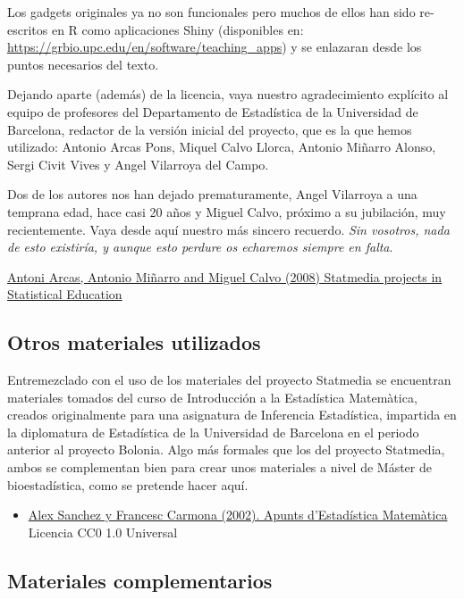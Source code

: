 \documentclass[
]{article}
\providecommand{\tightlist}{%
  \setlength{\itemsep}{0pt}\setlength{\parskip}{0pt}}
\begin{document}
Los gadgets originales ya no son funcionales pero muchos de ellos han sido re-escritos en R como aplicaciones Shiny (disponibles en: \url{https://grbio.upc.edu/en/software/teaching_apps}) y se enlazaran desde los puntos necesarios del texto.

Dejando aparte (además) de la licencia, vaya nuestro agradecimiento explícito al equipo de profesores del Departamento de Estadística de la Universidad de Barcelona, redactor de la versión inicial del proyecto, que es la que hemos utilizado: Antonio Arcas Pons, Miquel Calvo Llorca, Antonio Miñarro Alonso, Sergi Civit Vives y Angel Vilarroya del Campo.

Dos de los autores nos han dejado prematuramente, Angel Vilarroya a una temprana edad, hace casi 20 años y Miguel Calvo, próximo a su jubilación, muy recientemente. Vaya desde aquí nuestro más sincero recuerdo. \emph{Sin vosotros, nada de esto existiría, y aunque esto perdure os echaremos siempre en falta}.

\href{https://www.emis.de/journals/BEIO/files/BEIOv25n1_HE_A.Arcas+A.Minarro+M.Calvo.pdf}{Antoni Arcas, Antonio Miñarro and Miguel Calvo (2008) Statmedia projects in Statistical Education}

\subsection*{Otros materiales utilizados}\label{otros-materiales-utilizados}

Entremezclado con el uso de los materiales del proyecto Statmedia se encuentran materiales tomados del curso de Introducción a la Estadística Matemàtica, creados originalmente para una asignatura de Inferencia Estadística, impartida en la diplomatura de Estadística de la Universidad de Barcelona en el periodo anterior al proyecto Bolonia. Algo más formales que los del proyecto Statmedia, ambos se complementan bien para crear unos materiales a nivel de Máster de bioestadística, como se pretende hacer aquí.

\begin{itemize}
\tightlist
\item
  \href{https://github.com/ASPteaching/ApuntsEstadisticaMatematica}{Alex Sanchez y Francesc Carmona (2002). Apunts d'Estadística Matemàtica} Licencia CC0 1.0 Universal
\end{itemize}

\subsection*{Materiales complementarios}\label{materiales-complementarios}
\end{document}
